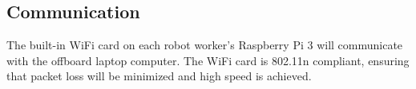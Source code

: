 
\subsection{Communication}
\label{sec:hardware_comm}

The built-in WiFi card on each robot worker's Raspberry Pi 3 will communicate with the offboard laptop computer. The WiFi card is 802.11n compliant, ensuring that packet loss will be minimized and high speed is achieved.